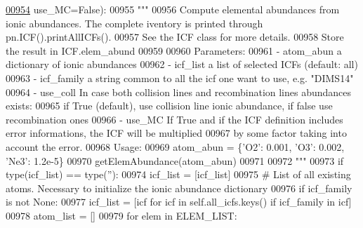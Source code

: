 \begin{DoxyCode}
\hypertarget{classpyneb_1_1core_1_1icf_1_1_i_c_f_l00954}{}\hyperlink{classpyneb_1_1core_1_1icf_1_1_i_c_f_a30b52d6d1ec148fba7c0a15cad653f61}{00954}                          use\_MC=\textcolor{keyword}{False}):
00955         \textcolor{stringliteral}{"""}
00956 \textcolor{stringliteral}{        Compute elemental abundances from ionic abundances. The complete iventory is printed through
       pn.ICF().printAllICFs().}
00957 \textcolor{stringliteral}{        See the ICF class for more details.}
00958 \textcolor{stringliteral}{        Store the result in ICF.elem\_abund}
00959 \textcolor{stringliteral}{        }
00960 \textcolor{stringliteral}{        Parameters: }
00961 \textcolor{stringliteral}{           - atom\_abun    a dictionary of ionic abundances}
00962 \textcolor{stringliteral}{           - icf\_list     a list of selected ICFs (default: all)}
00963 \textcolor{stringliteral}{           - icf\_family   a string common to all the icf one want to use, e.g. "DIMS14"}
00964 \textcolor{stringliteral}{           - use\_coll     In case both collision lines and recombination lines abundances exists:}
00965 \textcolor{stringliteral}{                           if True (default), use collision line ionic abundance, if false use
       recombination ones}
00966 \textcolor{stringliteral}{           - use\_MC       If True and if the ICF definition includes error informations, the ICF will be
       multiplied}
00967 \textcolor{stringliteral}{                           by some factor taking into account the error.}
00968 \textcolor{stringliteral}{        Usage:}
00969 \textcolor{stringliteral}{            atom\_abun = \{'O2': 0.001, 'O3': 0.002, 'Ne3': 1.2e-5\}}
00970 \textcolor{stringliteral}{            getElemAbundance(atom\_abun)}
00971 \textcolor{stringliteral}{         }
00972 \textcolor{stringliteral}{        """}
00973         \textcolor{keywordflow}{if} type(icf\_list) == type(\textcolor{stringliteral}{''}):
00974             icf\_list = [icf\_list]
00975         \textcolor{comment}{# List of all existing atoms. Necessary to initialize the ionic abundance dictionary}
00976         \textcolor{keywordflow}{if} icf\_family \textcolor{keywordflow}{is} \textcolor{keywordflow}{not} \textcolor{keywordtype}{None}:
00977             icf\_list = [icf \textcolor{keywordflow}{for} icf \textcolor{keywordflow}{in} self.all\_icfs.keys() \textcolor{keywordflow}{if} icf\_family \textcolor{keywordflow}{in} icf]
00978         atom\_list = []
00979         \textcolor{keywordflow}{for} elem \textcolor{keywordflow}{in} ELEM\_LIST:

\end{DoxyCode}
